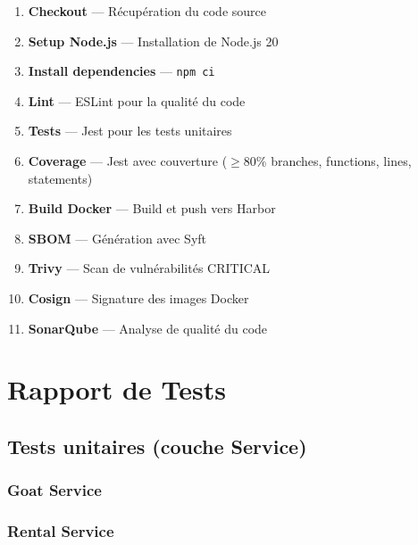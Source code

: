 \documentclass[12pt,a4paper]{report}
\begin{document}
\begin{enumerate}[leftmargin=*]
    \item \textbf{Checkout} --- Récupération du code source
    \item \textbf{Setup Node.js} --- Installation de Node.js 20
    \item \textbf{Install dependencies} --- \texttt{npm ci}
    \item \textbf{Lint} --- ESLint pour la qualité du code
    \item \textbf{Tests} --- Jest pour les tests unitaires
    \item \textbf{Coverage} --- Jest avec couverture ($\geq 80\%$ branches, functions, lines, statements)
    \item \textbf{Build Docker} --- Build et push vers Harbor
    \item \textbf{SBOM} --- Génération avec Syft
    \item \textbf{Trivy} --- Scan de vulnérabilités CRITICAL
    \item \textbf{Cosign} --- Signature des images Docker
    \item \textbf{SonarQube} --- Analyse de qualité du code
\end{enumerate}

\chapter{Rapport de Tests}

\section{Tests unitaires (couche Service)}

\subsection{Goat Service}

\begin{center}
\end{center}

\subsection{Rental Service}

\begin{center}
\end{center}
\end{document}
